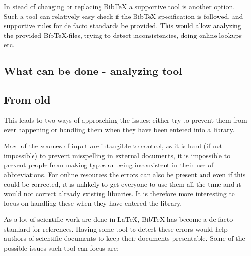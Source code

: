In stead of changing or replacing Bib{\TeX} a supportive tool is
another option.  Such a tool can relatively easy check if the
Bib{\TeX} specification is followed, and supportive rules for de facto
standards be provided.  This would allow analyzing the provided
Bib{\TeX}-files, trying to detect inconsistencies, doing online
lookups etc.

\subsection{What can be done - analyzing tool }



\subsection{From old}


This leads to two ways of approaching the issues: either try to
prevent them from ever happening or handling them when they have been
entered into a library.

Most of the sources of input are intangible to control, as it is hard
(if not impossible) to prevent misspelling in external documents, it
is impossible to prevent people from making typos or being
inconsistent in their use of abbreviations.  For online resources the
errors can also be present and even if this could be corrected, it is
unlikely to get everyone to use them all the time and it would not
correct already existing libraries.  It is therefore more
interesting to focus on handling these when they have entered the
library.

As a lot of  scientific work are
done in {\LaTeX}, Bib{\TeX} has become a de facto standard for
references.  Having some tool to detect these errors would help
authors of scientific documents to keep their documents presentable.
Some of the possible issues such tool can focus are:

